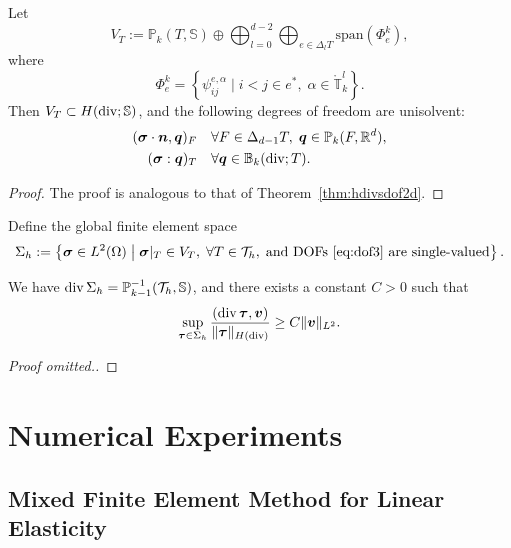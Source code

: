 \documentclass[letterpaper,12pt]{article}
\begin{document}
\begin{theorem}
\label{thm:hdivsdofnd}
Let
\[
V_T := \mathbb{P}_k(T, \mathbb{S}) \oplus \bigoplus_{l=0}^{d-2} \bigoplus_{e \in \Delta_l T} \mathrm{span}(\Phi_e^k),
\]
where
\[
\Phi_e^k = \left\{ \psi_{ij}^{e,\alpha} \mid i<j \in e^*,\; \alpha \in \mathring{\mathbb{T}}_k^l \right\}.
\]
Then $V_T \subset H(\mathop{\mathrm{div}}; \mathbb{S})$, and the following degrees of freedom are unisolvent:
\begin{align}
(\boldsymbol{\sigma}\cdot \boldsymbol{n}, \boldsymbol{q})_F & \quad \forall F \in \Delta_{d-1} T,\; \boldsymbol{q} \in \mathbb{P}_k(F, \mathbb{R}^d), \label{eq:dof3}\\
(\boldsymbol{\sigma} : \boldsymbol{q})_T & \quad \forall \boldsymbol{q} \in \mathbb{B}_k(\mathop{\mathrm{div}}; T). \label{eq:dof4}
\end{align}
\end{theorem}

\begin{proof}
The proof is analogous to that of Theorem~\ref{thm:hdivsdof2d}.
\end{proof}

Define the global finite element space
\[
\Sigma_h := \left\{ \boldsymbol{\sigma} \in L^2(\Omega) \;\middle|\;
\boldsymbol{\sigma}|_T \in V_T,\; \forall T \in \mathcal{T}_h,\;
\text{and DOFs \eqref{eq:dof3} are single-valued} \right\}.
\]

\begin{theorem}
\label{thm:infsup}
We have $\mathop{\mathrm{div}} \Sigma_h = \mathbb{P}_{k-1}^{-1}(\mathcal{T}_h, \mathbb{S})$, and there exists a constant $C > 0$ such that
\begin{equation}
\label{eq:infsup}
\sup_{\boldsymbol{\tau} \in \Sigma_h} 
\frac{(\mathop{\mathrm{div}} \boldsymbol{\tau}, \boldsymbol{v})}{\|\boldsymbol{\tau}\|_{H(\mathop{\mathrm{div}})}}
\geq C \|\boldsymbol{v}\|_{L^2}.
\end{equation}
\end{theorem}

\begin{proof}
[Proof omitted.]
\end{proof}


\section{Numerical Experiments}

\subsection{Mixed Finite Element Method for Linear Elasticity}
\end{document}
